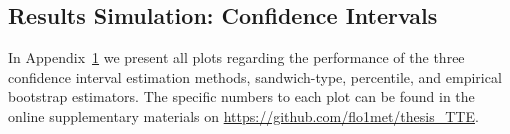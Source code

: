 \documentclass[pdflatex,sn-vancouver-ay]{sn-jnl}%
\theoremstyle{thmstyleone}%
\theoremstyle{thmstyletwo}%
\theoremstyle{thmstylethree}%
\begin{document}
\begin{appendices}
\newpage



\section{Results Simulation: Confidence Intervals}\label{ApxSim1CI}


In Appendix~\ref{ApxSim1CI} we present all plots regarding the performance of the three confidence interval estimation methods, sandwich-type, percentile, and empirical bootstrap estimators. The specific numbers to each plot can be found in the online supplementary materials on \url{https://github.com/flo1met/thesis_TTE}.

\newpage


\end{appendices}
\end{document}
